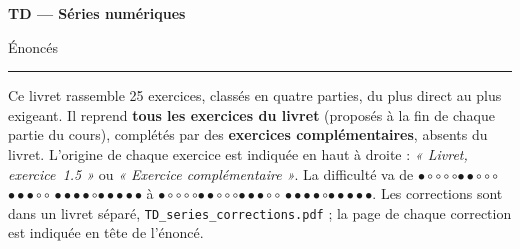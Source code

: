 \documentclass[a4paper,11pt]{article}
\numberwithin{equation}{section}
\numberwithin{figure}{section}
\numberwithin{table}{section}
\theoremstyle{enonce}
\theoremstyle{exemple}
\theoremstyle{remarque}
\newcommand{\niveau}[1]{{\color{Ocre}\footnotesize
  \ifcase#1\or$\bullet\circ\circ\circ\circ$\or$\bullet\bullet\circ\circ\circ$\or$\bullet\bullet\bullet\circ\circ$%
  \or$\bullet\bullet\bullet\bullet\circ$\or$\bullet\bullet\bullet\bullet\bullet$\fi}}
\begin{document}
\thispagestyle{plain}
{\sffamily\small\color{Gris}}\par\vspace{0.2em}
{\sffamily\bfseries\fontsize{26}{30}\selectfont\color{Ink}TD --- Séries numériques}\par\vspace{0.3em}
{\sffamily\Large\color{BleuMoyen}Énoncés}\par\vspace{0.4em}
{\color{Ocre}\rule{3.2cm}{1.4pt}}\par\vspace{0.8em}
{\small Ce livret rassemble 25 exercices, classés en quatre parties, du plus direct au plus exigeant.
Il reprend \textbf{tous les exercices du livret} (proposés à la fin de chaque partie du cours), complétés par des
\textbf{exercices complémentaires}, absents du livret. L'origine de chaque exercice est indiquée en haut à droite :
\emph{« Livret, exercice~1.5 »} ou \emph{« Exercice complémentaire »}. La difficulté va de \niveau{1} à \niveau{5}.
Les corrections sont dans un livret séparé, \texttt{TD\_series\_corrections.pdf} ; la page de chaque correction est indiquée en tête de l'énoncé.}
\end{document}
